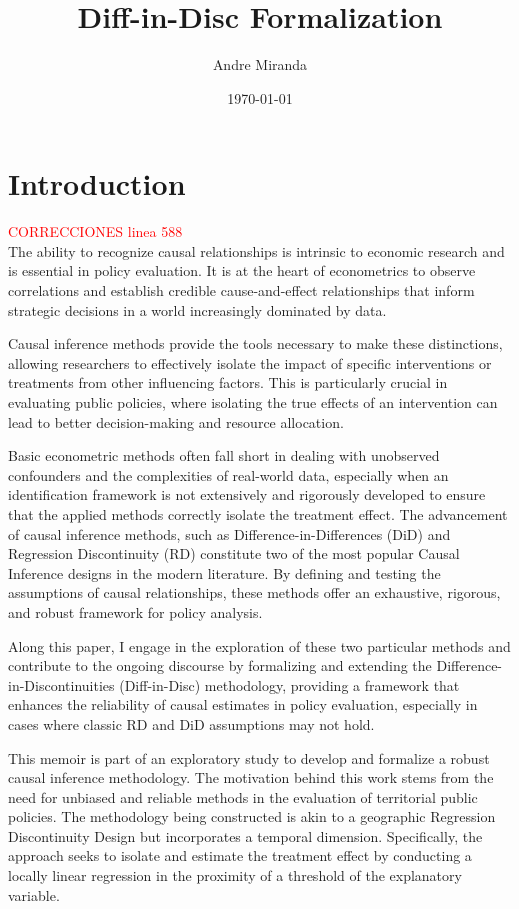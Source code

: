 \documentclass[12pt]{article}
\title{Diff-in-Disc Formalization}
\author{Andre Miranda}
\date{\today}
\theoremstyle{plain}
\theoremstyle{remark}
\begin{document}
\maketitle

\newpage
\tableofcontents

\newpage

\section{Introduction}
\textcolor{red}{CORRECCIONES linea 588}\\
The ability to recognize causal relationships is intrinsic to economic research and is essential in policy evaluation. It is at the heart of econometrics to observe correlations and establish credible cause-and-effect relationships that inform strategic decisions in a world increasingly dominated by data. 

Causal inference methods provide the tools necessary to make these distinctions, allowing researchers to effectively isolate the impact of specific interventions or treatments from other influencing factors. This is particularly crucial in evaluating public policies, where isolating the true effects of an intervention can lead to better decision-making and resource allocation. 

Basic econometric methods often fall short in dealing with unobserved confounders and the complexities of real-world data, especially when an identification framework is not extensively and rigorously developed to ensure that the applied methods correctly isolate the treatment effect. The advancement of causal inference methods, such as Difference-in-Differences (DiD) and Regression Discontinuity (RD) constitute two of the most popular Causal Inference designs in the modern literature. By defining and testing the assumptions of causal relationships, these methods offer an exhaustive, rigorous, and robust framework for policy analysis. 

Along this paper, I engage in the exploration of these two particular methods and contribute to the ongoing discourse by formalizing and extending the Difference-in-Discontinuities (Diff-in-Disc) methodology, providing a framework that enhances the reliability of causal estimates in policy evaluation, especially in cases where classic RD and DiD assumptions may not hold.

This memoir is part of an exploratory study to develop and formalize a robust causal inference methodology. The motivation behind this work stems from the need for unbiased and reliable methods in the evaluation of territorial public policies. The methodology being constructed is akin to a geographic Regression Discontinuity Design but incorporates a temporal dimension. Specifically, the approach seeks to isolate and estimate the treatment effect by conducting a locally linear regression in the proximity of a threshold of the explanatory variable.
\end{document}
